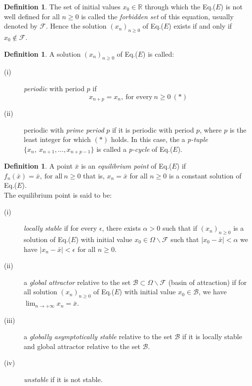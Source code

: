 \documentclass[11pt]{amsart}
\theoremstyle{definition}
\newtheorem{defn}[thm]{Definition}
\theoremstyle{remark}
\theoremstyle{example}
\numberwithin{equation}{section}
\begin{document}
\begin{defn}
The set of initial values $x_0 \in  \mathbb{R}$ through which the Eq.($E$) is not well defined for all $n\geq0$ is called the
\textit{forbidden set} of this equation, usually denoted by $\mathcal{F}$.
Hence the solution $(x_n)_{n\geq0}$ of Eq.($E$) exists if and only if $x_0 \not\in \mathcal{F}$.
\end{defn}
\begin{defn}
A solution $(x_n)_{n\geq0}$ of Eq.($E$) is called:
\begin{description}
\item[(i)] \textit{periodic} with period $p$ if
$$x_{n+p}=x_n, \ \text{for every} \ n\geq0 \ (*)$$
\item[(ii)] periodic with \textit{prime period} $p$ if it is periodic with period $p$, where $p$ is the least integer
for which $(*)$ holds. In this case, the a \textit{p-tuple} $\{x_n, \ x_{n+1},\ldots,x_{n+p-1}\}$ is called a \textit{p-cycle} of Eq.($E$).
\end{description}
\end{defn}
\begin{defn}
A point $\bar{x}$ is an \textit{equilibrium point} of Eq.($E$) if $f_n(\bar{x})=\bar{x}, \ \text{for all} \ n\geq0$ that is, $x_n=\bar{x}$ for all $n\geq0$ is a constant solution of Eq.($E$).\\
The equilibrium point is said to be:
\begin{description}
\item[(i)] \textit{locally stable} if for every $\epsilon$, there exists $\alpha>0$ such that if $(x_n)_{n\geq0}$ is a
solution of Eq.($E$) with initial value $x_0 \in \Omega\backslash\mathcal{F}$ such that $\mid x_0-\bar{x}\mid<\alpha$ we have
$ \mid x_n-\bar{x}\mid<\epsilon$ for all $n\geq0$.
\item[(ii)] a \textit{global attractor} relative to the set $\mathcal{B}\subset\Omega\backslash\mathcal{F}$
(basin of attraction) if for all solution $(x_n)_{n\geq0}$ of Eq.($E$) with initial value $x_0 \in  \mathcal{B}$,
we have $\displaystyle{\lim_{n\rightarrow+\infty}x_n=\bar{x}}$.
\item[(iii)] a \textit{globally asymptotically stable} relative to the set $\mathcal{B}$ if it is locally stable
and global attractor relative to the set $\mathcal{B}$.
\item[(iv)] \textit{unstable} if it is not stable.
\end{description}
\end{defn}
\end{document}
